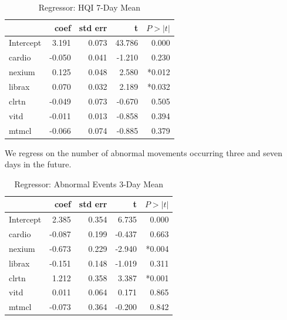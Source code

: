 \documentclass[conference]{IEEEtran}
\begin{document}
\begin{table}
\begin{center}
\caption {Regressor: HQI 7-Day Mean} \label{tab:hqi_7daymean}
    \begin{tabular}{ | l | r | r | r | r |}
    \hline
     & coef & std err & t & $P>\left|t\right|$ \\ \hline
Intercept & 3.191 & 0.073 & 43.786 & 0.000 \\
cardio & -0.050 & 0.041 & -1.210 & 0.230 \\
nexium & 0.125 & 0.048 & 2.580 & *0.012 \\
librax & 0.070 & 0.032 & 2.189 & *0.032 \\
clrtn & -0.049 & 0.073 & -0.670 & 0.505 \\
vitd & -0.011 & 0.013 & -0.858 & 0.394 \\
mtmcl & -0.066 & 0.074 & -0.885 & 0.379 \\
    \hline
    \end{tabular}
\end{center}
\end{table}


We regress on the number of abnormal movements occurring three and seven days in the future.

\begin{table}
\begin{center}
    \caption{Regressor: Abnormal Events 3-Day Mean} \label{tab:abnormal_3daymean}
    \begin{tabular}{ | l | r | r | r | r |}
    \hline
     & coef & std err & t & $P>\left|t\right|$ \\ \hline
Intercept & 2.385 & 0.354 & 6.735 & 0.000 \\
cardio & -0.087 & 0.199 & -0.437 & 0.663 \\
nexium & -0.673 & 0.229 & -2.940 & *0.004 \\
librax & -0.151 & 0.148 & -1.019 & 0.311 \\
clrtn & 1.212 & 0.358 & 3.387 & *0.001 \\
vitd & 0.011 & 0.064 & 0.171 & 0.865 \\
mtmcl & -0.073 & 0.364 & -0.200 & 0.842 \\
    \hline
    \end{tabular}
\end{center}
\end{table}
\end{document}
